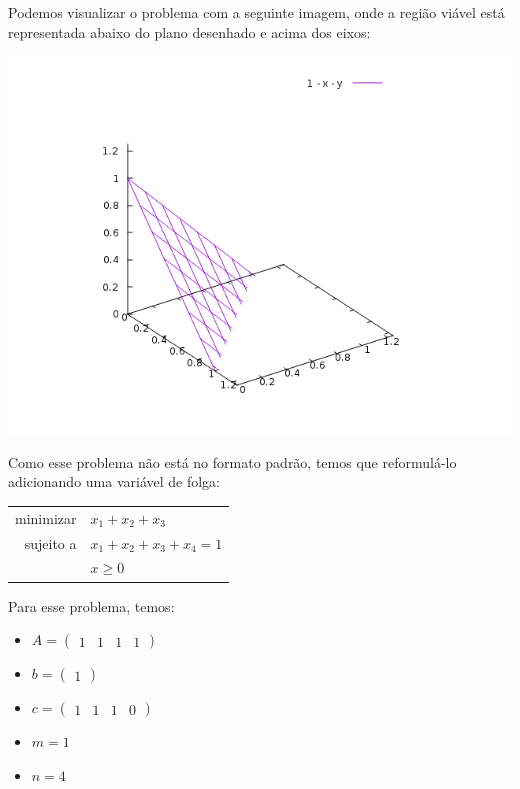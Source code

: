 \documentclass[12pt]{article}
\begin{document}
	Podemos visualizar o problema com a seguinte imagem, onde a região viável está representada abaixo do plano desenhado e acima dos eixos:
	\begin{center}
	\includegraphics[scale=0.8]{xyz}	
	\end{center}

	Como esse problema não está no formato padrão, temos que reformulá-lo adicionando uma variável de folga:
	\begin{center}	
    	\begin{tabular}{r l}
	  		minimizar & $x_1 + x_2 + x_3$ \\
        
        	sujeito a & $x_1 + x_2 + x_3 + x_4 = 1$ \\
            & $x \geq 0$ \\
        \end{tabular}
    \end{center}
    
    Para esse problema, temos: 
	   
	\begin{itemize}
	\item $A = \begin{pmatrix}
    1 & 1 & 1 & 1
    \end{pmatrix}$
    
	\item $b = \begin{pmatrix}
    1 
    \end{pmatrix} $
    
    \item $c = \begin{pmatrix}
    1 & 1 & 1 & 0
    \end{pmatrix}$
    
    \item $m = 1$
    
    \item $n = 4$
	\end{itemize}
	
\end{document}
